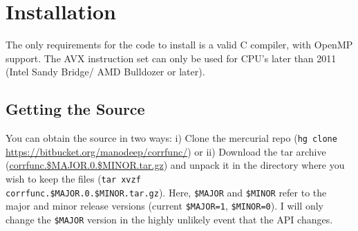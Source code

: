 \documentclass[12pt,titlepage]{article}
\begin{document}

\section{Installation}
The only requirements for the code to install is a valid C compiler, with OpenMP support. The AVX
instruction set can only be used for CPU's later than 2011 (Intel Sandy Bridge/ AMD Bulldozer or later). 

\subsection{Getting the Source}
You can obtain the source in two ways: i) Clone the mercurial repo (\texttt{hg clone} \url{https://bitbucket.org/manodeep/corrfunc/}) 
or ii) Download the tar archive (\href{https://bitbucket.org/manodeep/corrfunc/downloads/corrfunc.1.0.0.tar.gz}{corrfunc.\$MAJOR.0.\$MINOR.tar.gz}) and 
unpack it in the directory where you wish to keep the files (\texttt{tar xvzf}\\ \texttt{corrfunc.\$MAJOR.0.\$MINOR.tar.gz}). Here, \texttt{\$MAJOR}
and \texttt{\$MINOR} refer to the major and minor release versions (current \texttt{\$MAJOR=1}, \texttt{\$MINOR=0}). I will only change 
the \texttt{\$MAJOR} version in the highly unlikely event that the API changes. 
\end{document}
